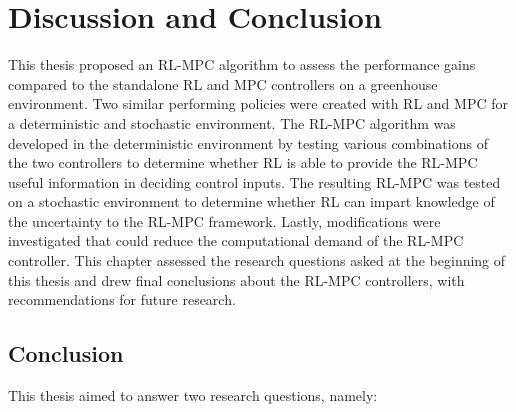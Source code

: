 \chapter{Discussion and Conclusion}
\label{chapter:conclusion}

This thesis proposed an RL-MPC algorithm to assess the performance gains compared to the standalone RL and MPC controllers on a greenhouse environment. Two similar performing policies were created with RL and MPC for a deterministic and stochastic environment. The RL-MPC algorithm was developed in the deterministic environment by testing various combinations of the two controllers to determine whether RL is able to provide the RL-MPC useful information in deciding control inputs. The resulting RL-MPC was tested on a stochastic environment to determine whether RL can impart knowledge of the uncertainty to the RL-MPC framework. Lastly, modifications were investigated that could reduce the computational demand of the RL-MPC controller. This chapter assessed the research questions asked at the beginning of this thesis and drew final conclusions about the RL-MPC controllers, with recommendations for future research.

\section{Conclusion}
This thesis aimed to answer two research questions, namely:

